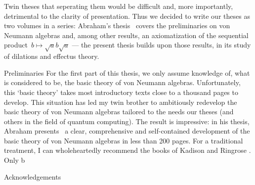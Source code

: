 \documentclass[b]{subfiles}
\begin{document}
\begin{parsec}
\begin{point}{Twin theses}
    that seperating them would be difficult
    and, more importantly, detrimental to the clarity of presentation.
Thus we decided to write our theses as two volumes in a series:
    Abraham's thesis~\cite{bram} covers the preliminaries on von Neumann
    algebras and, among other results, an axiomatization of
        the sequential product~$b\mapsto \sqrt{a}b\sqrt{a}$
        --- the present thesis
            builds upon those results,
            in its study of dilations and effectus theory.
\end{point}
\begin{point}{Preliminaries}%
For the first part of this thesis,
    we only assume knowledge of, what is considered to be,
    the basic theory of von Neumann algebras.
Unfortunately, this `basic theory' takes most introductory texts
    close to a thousand pages to develop.
This situation has led my twin brother to ambitiously
     redevelop the basic theory of von Neumann algebras
     tailored to the needs our theses (and others
     in the field of quantum computing).
The result is impressive:
    in his thesis, Abraham presents~\cite{bram}
    a clear, comprehensive and self-contained development of the basic
    theory of von Neumann algebras in less than 200 pages.
For a traditional treatment,
    I can wholeheartedly recommend the books of Kadison and Ringrose \cite{kr}.
Only b
\end{point}
\begin{point}{Acknowledgements}%
    
\end{point}
\end{parsec}
\end{document}
